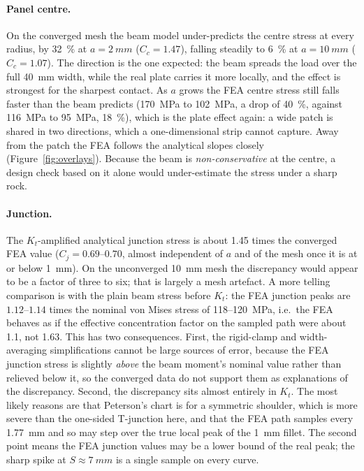\documentclass[10pt,a4paper]{article}
\begin{document}
\paragraph{Panel centre.}
On the converged mesh the beam model under-predicts the centre stress at every radius, by \SI{32}{\percent} at $a = \SI{2}{mm}$ ($C_c = 1.47$), falling steadily to \SI{6}{\percent} at $a = \SI{10}{mm}$ ($C_c = 1.07$). The direction is the one expected: the beam spreads the load over the full \SI{40}{mm} width, while the real plate carries it more locally, and the effect is strongest for the sharpest contact. As $a$ grows the FEA centre stress still falls faster than the beam predicts (\SI{170}{MPa} to \SI{102}{MPa}, a drop of \SI{40}{\percent}, against \SI{116}{MPa} to \SI{95}{MPa}, \SI{18}{\percent}), which is the plate effect again: a wide patch is shared in two directions, which a one-dimensional strip cannot capture. Away from the patch the FEA follows the analytical slopes closely (Figure~\ref{fig:overlays}). Because the beam is \emph{non-conservative} at the centre, a design check based on it alone would under-estimate the stress under a sharp rock.

\paragraph{Junction.}
The $K_t$-amplified analytical junction stress is about 1.45 times the converged FEA value ($C_j = 0.69$--$0.70$, almost independent of $a$ and of the mesh once it is at or below \SI{1}{mm}). On the unconverged \SI{10}{mm} mesh the discrepancy would appear to be a factor of three to six; that is largely a mesh artefact. A more telling comparison is with the plain beam stress before $K_t$: the FEA junction peaks are $1.12$--$1.14$ times the nominal von Mises stress of 118--\SI{120}{MPa}, i.e.\ the FEA behaves as if the effective concentration factor on the sampled path were about 1.1, not 1.63. This has two consequences. First, the rigid-clamp and width-averaging simplifications cannot be large sources of error, because the FEA junction stress is slightly \emph{above} the beam moment's nominal value rather than relieved below it, so the converged data do not support them as explanations of the discrepancy. Second, the discrepancy sits almost entirely in $K_t$. The most likely reasons are that Peterson's chart is for a symmetric shoulder, which is more severe than the one-sided T-junction here, and that the FEA path samples every \SI{1.77}{mm} and so may step over the true local peak of the \SI{1}{mm} fillet. The second point means the FEA junction values may be a lower bound of the real peak; the sharp spike at $S \approx \SI{7}{mm}$ is a single sample on every curve.
\end{document}
